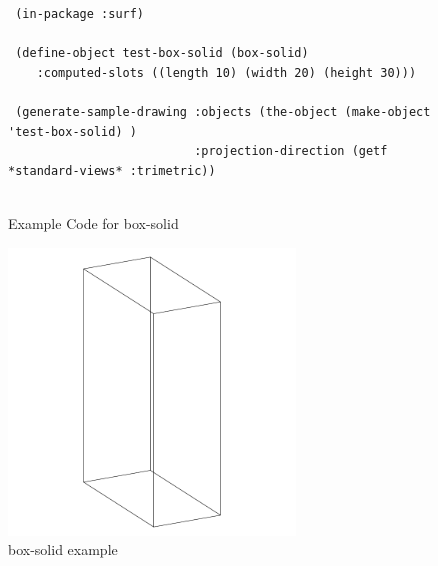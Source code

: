 \documentclass [11pt]{book}
\begin{document}
\begin{itemize}
\begin{description}
\end{description}




\begin{figure}
\begin{lrbox}{\boxedverb}
\begin{minipage}{\linewidth}
{\small

\begin{verbatim}
 (in-package :surf)

 (define-object test-box-solid (box-solid)
    :computed-slots ((length 10) (width 20) (height 30)))

 (generate-sample-drawing :objects (the-object (make-object 'test-box-solid) )
                          :projection-direction (getf *standard-views* :trimetric))


\end{verbatim}}
\end{minipage}
\end{lrbox}
\fbox{\usebox{\boxedverb}}

\caption{Example Code for box-solid}

\label{fig:example-code-box-solid}

\end{figure}

\begin{figure}
\begin{center}
\includegraphics[width=3in,height=3in]{../images/example-box-solid.pdf}
\end{center}

\caption{box-solid example}

\label{fig:box-solid}

\end{figure}







\end{itemize}
\end{document}
